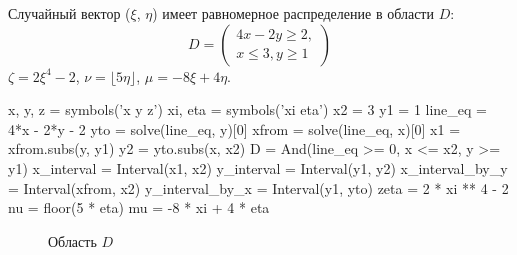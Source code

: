 
Случайный вектор ($\xi$, $\eta$) имеет равномерное распределение в области $D$:
\[
    D=\begin{pmatrix}4x-2y\geqslant2,\\x\leqslant3,y\geqslant1\end{pmatrix}
\]
$\zeta=2\xi^4-2$, $\nu=\lfloor5\eta\rfloor$, $\mu= -8\xi+4\eta$.

\begin{sympycode}
x, y, z = symbols('x y z')
xi, eta = symbols('xi eta')
x2 = 3
y1 = 1
line_eq = 4*x - 2*y - 2
yto = solve(line_eq, y)[0]
xfrom = solve(line_eq, x)[0]
x1 = xfrom.subs(y, y1)
y2 = yto.subs(x, x2)
D = And(line_eq >= 0, x <= x2, y >= y1)
x_interval = Interval(x1, x2)
y_interval = Interval(y1, y2)
x_interval_by_y = Interval(xfrom, x2)
y_interval_by_x = Interval(y1, yto)
zeta = 2 * xi ** 4 - 2
nu = floor(5 * eta)
mu = -8 * xi + 4 * eta
\end{sympycode}

\begin{figure}[h!]
    \centering
    \caption{Область $D$}
    \label{fig:D}
\end{figure}

